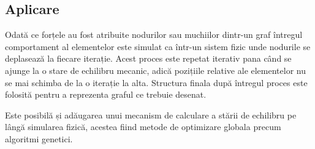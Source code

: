 \subsection{Aplicare}

Odată ce forțele au fost atribuite nodurilor sau muchiilor dintr-un graf întregul comportament al elementelor 
este simulat ca într-un sistem fizic unde nodurile se deplasează la fiecare iterație. Acest proces este repetat 
iterativ pana când se ajunge la o stare de echilibru mecanic, adică pozițiile relative ale elementelor nu se mai 
schimba de la o iterație la alta. Structura finala după întregul proces este folosită pentru a reprezenta graful ce 
trebuie desenat.\newline

Este posibilă și adăugarea unui mecanism de calculare a stării de echilibru pe lângă simularea fizică, acestea fiind 
metode de optimizare globala precum algoritmi genetici.\newline

